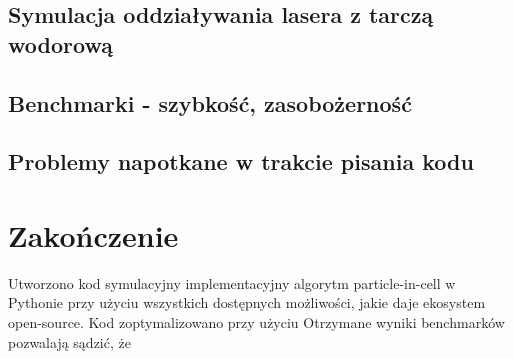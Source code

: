 \subsection{Symulacja oddziaływania lasera z tarczą wodorową}
\subsection{Benchmarki - szybkość, zasobożerność} %
\subsection{Problemy napotkane w trakcie pisania kodu}

\section[Zakończenie]{Zakończenie} %
Utworzono kod symulacyjny implementacyjny algorytm particle-in-cell w Pythonie przy użyciu wszystkich dostępnych
możliwości, jakie daje ekosystem open-source. Kod zoptymalizowano przy użyciu %
Otrzymane wyniki benchmarków pozwalają sądzić, że %

